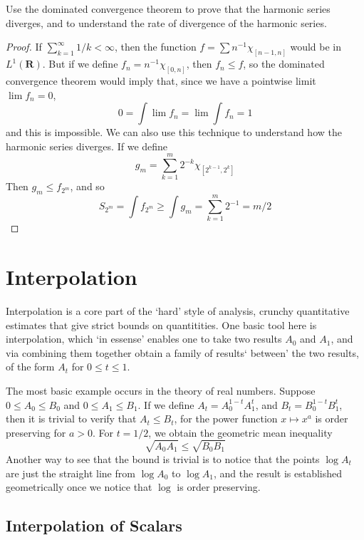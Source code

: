 \begin{exercise}[Tao]
    Use the dominated convergence theorem to prove that the harmonic series diverges, and to understand the rate of divergence of the harmonic series.
\end{exercise}
\begin{proof}
    If $\sum_{k = 1}^\infty 1/k < \infty$, then the function $f = \sum n^{-1} \chi_{[n-1,n]}$ would be in $L^1(\mathbf{R})$. But if we define $f_n = n^{-1} \chi_{[0,n]}$, then $f_n \leq f$, so the dominated convergence theorem would imply that, since we have a pointwise limit $\lim f_n = 0$,
    \[ 0 = \int \lim f_n = \lim \int f_n = 1 \]
    and this is impossible. We can also use this technique to understand how the harmonic series diverges. If we define
    \[ g_m = \sum_{k = 1}^m 2^{-k} \chi_{[2^{k-1}, 2^k]} \]
    Then $g_m \leq f_{2^m}$, and so
    \[ S_{2^m} = \int f_{2^m} \geq \int g_m = \sum_{k = 1}^m 2^{-1} = m/2 \]
\end{proof}

\chapter{Interpolation}

Interpolation is a core part of the `hard' style of analysis, crunchy quantitative estimates that give strict bounds on quantitities. One basic tool here is interpolation, which `in essense' enables one to take two results $A_0$ and $A_1$, and via combining them together obtain a family of results` between' the two results, of the form $A_t$ for $0 \leq t \leq 1$.

The most basic example occurs in the theory of real numbers. Suppose $0 \leq A_0 \leq B_0$ and $0 \leq A_1 \leq B_1$. If we define $A_t = A_0^{1-t}A_1^t$, and $B_t = B_0^{1-t}B_1^t$, then it is trivial to verify that $A_t \leq B_t$, for the power function $x \mapsto x^a$ is order preserving for $a > 0$. For $t = 1/2$, we obtain the geometric mean inequality
%
\[ \sqrt{A_0 A_1} \leq \sqrt{B_0 B_1} \]
%
Another way to see that the bound is trivial is to notice that the points $\log A_t$ are just the straight line from $\log A_0$ to $\log A_1$, and the result is established geometrically once we notice that $\log$ is order preserving.

\section{Interpolation of Scalars}

